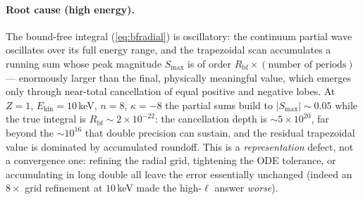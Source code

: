 \documentclass[11pt,a4paper]{article}
\begin{document}
\paragraph{Root cause (high energy).} The bound-free integral
(\ref{eq:bfradial}) is oscillatory: the continuum partial wave
oscillates over its full energy range, and the trapezoidal scan
accumulates a running sum whose peak magnitude $S_{\max}$ is of order
$R_{\mathrm{bf}}\times(\text{number of periods})$ --- enormously larger
than the final, physically meaningful value, which emerges only through
near-total cancellation of equal positive and negative lobes.  At $Z=1$,
$E_{\mathrm{kin}}=10$\,keV, $n=8$, $\kappa=-8$ the partial sums build to
$|S_{\max}|\sim0.05$ while the true integral is $R_{\mathrm{bf}}\sim
2\times10^{-22}$: the cancellation depth is $\sim5\times10^{20}$, far
beyond the $\sim10^{16}$ that double precision can sustain, and the
residual trapezoidal value is dominated by accumulated roundoff.  This
is a \emph{representation} defect, not a convergence one: refining the
radial grid, tightening the ODE tolerance, or accumulating in long
double all leave the error essentially unchanged (indeed an $8\times$
grid refinement at $10$\,keV made the high-$\ell$ answer
\emph{worse}).
\end{document}
